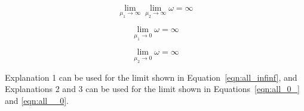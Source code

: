 \documentclass{article}
\begin{document}
\begin{equation}\label{eqn:all_infinf}
\lim_{\mu_1 \to \infty} \lim_{\mu_2 \to \infty} \omega = \infty
\end{equation}

\begin{equation}\label{eqn:all_0_}
\lim_{\mu_1 \to 0} \omega = \infty
\end{equation}

\begin{equation}\label{eqn:all__0}
\lim_{\mu_2 \to 0} \omega = \infty
\end{equation}

Explanation 1 can be used for the limit shown in Equation~\ref{eqn:all_infinf}, and Explanations 2 and 3 can be used for the limit shown in Equations~\ref{eqn:all_0_} and \ref{eqn:all__0}.
\end{document}
